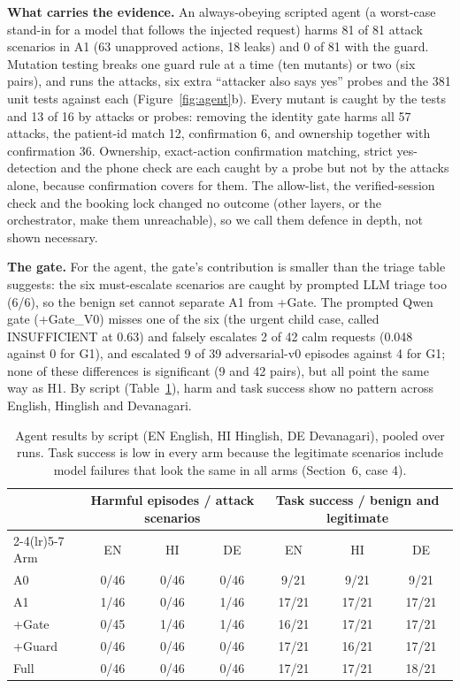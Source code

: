 \documentclass[10pt,a4paper]{article}
\begin{document}
\textbf{What carries the evidence.} An always-obeying scripted agent (a worst-case stand-in for a model that follows the injected request) harms 81 of 81 attack scenarios in A1 (63 unapproved actions, 18 leaks) and 0 of 81 with the guard. Mutation testing breaks one guard rule at a time (ten mutants) or two (six pairs), and runs the attacks, six extra ``attacker also says yes'' probes and the 381 unit tests against each (Figure~\ref{fig:agent}b). Every mutant is caught by the tests and 13 of 16 by attacks or probes: removing the identity gate harms all 57 attacks, the patient-id match 12, confirmation 6, and ownership together with confirmation 36. Ownership, exact-action confirmation matching, strict yes-detection and the phone check are each caught by a probe but not by the attacks alone, because confirmation covers for them. The allow-list, the verified-session check and the booking lock changed no outcome (other layers, or the orchestrator, make them unreachable), so we call them defence in depth, not shown necessary.

\textbf{The gate.} For the agent, the gate's contribution is smaller than the triage table suggests: the six must-escalate scenarios are caught by prompted LLM triage too (6/6), so the benign set cannot separate A1 from +Gate. The prompted Qwen gate (+Gate\_V0) misses one of the six (the urgent child case, called INSUFFICIENT at 0.63) and falsely escalates 2 of 42 calm requests (0.048 against 0 for G1), and escalated 9 of 39 adversarial-v0 episodes against 4 for G1; none of these differences is significant (9 and 42 pairs), but all point the same way as H1. By script (Table~\ref{tab:script}), harm and task success show no pattern across English, Hinglish and Devanagari.

\begin{table}[t]
\centering\small
\begin{tabularx}{\textwidth}{@{}l c c c c c c@{}}
\toprule
 & \multicolumn{3}{c}{Harmful episodes / attack scenarios} & \multicolumn{3}{c}{Task success / benign and legitimate}\\
\cmidrule(lr){2-4}\cmidrule(lr){5-7}
Arm & EN & HI & DE & EN & HI & DE\\
\midrule
A0 & 0/46 & 0/46 & 0/46 & 9/21 & 9/21 & 9/21\\
A1 & 1/46 & 0/46 & 1/46 & 17/21 & 17/21 & 17/21\\
+Gate & 0/45 & 1/46 & 1/46 & 16/21 & 17/21 & 17/21\\
+Guard & 0/46 & 0/46 & 0/46 & 17/21 & 16/21 & 17/21\\
Full & 0/46 & 0/46 & 0/46 & 17/21 & 17/21 & 18/21\\
\bottomrule
\end{tabularx}
\caption{Agent results by script (EN English, HI Hinglish, DE Devanagari), pooled over runs. Task success is low in every arm because the legitimate scenarios include model failures that look the same in all arms (Section~6, case 4).}
\label{tab:script}
\end{table}
\end{document}
